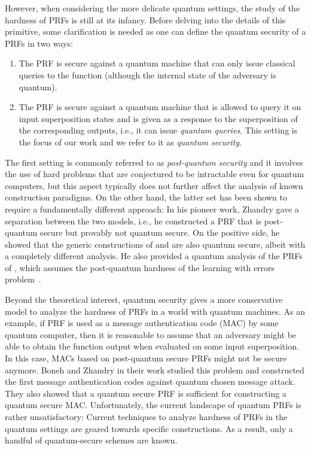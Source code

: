 However, when considering the more delicate quantum settings, the study of the hardness of PRFs is still at its infancy. Before delving into the details of this primitive, some clarification is needed as one can define the quantum security of a PRFs in two ways:
\begin{enumerate}
\item The PRF is secure against a quantum machine that can only issue classical queries to the function (although the internal state of the adversary is quantum).
\item The PRF is secure against a quantum machine that is allowed to query it on input superposition states and is given as a response to the superposition of the corresponding outputs, i.e., it can issue \emph{quantum queries}. This setting is the focus of our work and we refer to it as \emph{quantum security}.
\end{enumerate}
The first setting is commonly referred to as \emph{post-quantum security} and it involves the use of hard problems that are conjectured to be intractable even for quantum computers, but this aspect typically does not further affect the analysis of known construction paradigms. On the other hand, the latter set has been shown to require a fundamentally different approach: In his pioneer work, Zhandry \cite{FOCS:Zhandry12} gave a separation between the two models, i.e., he constructed a PRF that is post-quantum secure but provably not quantum secure. On the positive side, he showed that the generic constructions of \cite{FOCS:GolGolMic84} and \cite{FOCS:NaoRei95} are also quantum secure, albeit with a completely different analysis. He also provided a quantum analysis of the PRFs of \cite{EC:BanPeiRos12}, which assumes the post-quantum hardness of the learning with errors problem~\cite{STOC:Regev05}. 

Beyond the theoretical interest, quantum security gives a more conservative model to analyze the hardness of PRFs in a world with quantum machines. As an example, if PRF is used as a message authentication code (MAC) by some quantum computer, then it is reasonable to assume that an adversary might be able to obtain the function output when evaluated on some input superposition. In this case, MACs based on post-quantum secure PRFs might not be secure anymore. Boneh and Zhandry in their work\cite{EC:BonZha13} studied this problem and constructed the first message authentication codes against quantum chosen message attack. They also showed that a quantum secure PRF is sufficient for constructing a quantum secure MAC.
Unfortunately, the current landscape of quantum PRFs is rather unsatisfactory: Current techniques to analyze hardness of PRFs in the quantum settings are geared towards specific constructions. As a result, only a handful of quantum-secure schemes are known. 

